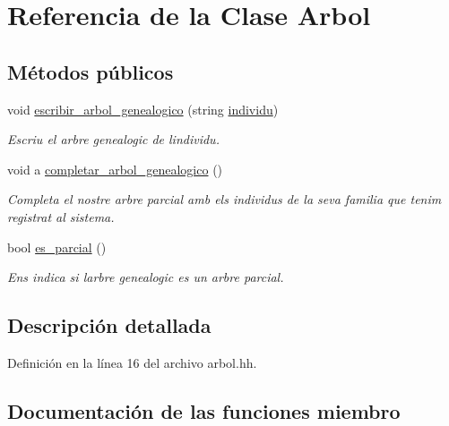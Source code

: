 \hypertarget{class_arbol}{}\section{Referencia de la Clase Arbol}
\label{class_arbol}
\subsection*{Métodos públicos}
\begin{DoxyCompactItemize}
\item 
void \hyperlink{class_arbol_a09980b861e2d8e4f3b1ac4f9ac13fb65}{escribir\+\_\+arbol\+\_\+genealogico} (string \hyperlink{classindividu}{individu})
\begin{DoxyCompactList}\small\item\em Escriu el arbre genealogic de l\textquotesingle{}individu. \end{DoxyCompactList}\item 
void a \hyperlink{class_arbol_a6d0fc9bf894ce3c644917298c4cd5390}{completar\+\_\+arbol\+\_\+genealogico} ()
\begin{DoxyCompactList}\small\item\em Completa el nostre arbre parcial amb els individus de la seva familia que tenim registrat al sistema. \end{DoxyCompactList}\item 
bool \hyperlink{class_arbol_a97e4cf3113d3ea3c04fbd49fa6871b1a}{es\+\_\+parcial} ()
\begin{DoxyCompactList}\small\item\em Ens indica si l\textquotesingle{}arbre genealogic es un arbre parcial. \end{DoxyCompactList}\end{DoxyCompactItemize}


\subsection{Descripción detallada}


Definición en la línea 16 del archivo arbol.\+hh.



\subsection{Documentación de las funciones miembro}
\hypertarget{class_arbol_a09980b861e2d8e4f3b1ac4f9ac13fb65}{}
